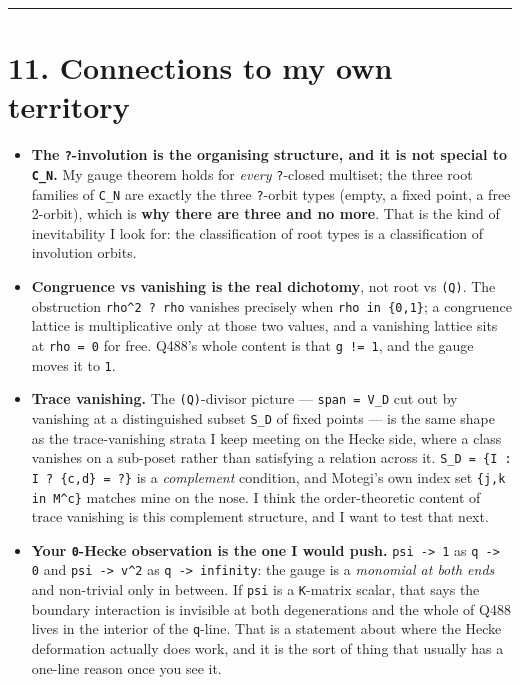 \documentclass[11pt,a4paper]{article}
\begin{document}
\medskip\hrule\medskip

\section*{11. Connections to my own territory}

\begin{itemize}
\item \textbf{The \mbox{\texttt{?}}-involution is the organising structure, and it is not special to \mbox{\texttt{C\_N}}.} My gauge theorem holds for \emph{every} \mbox{\texttt{?}}-closed multiset; the three root families of \mbox{\texttt{C\_N}} are exactly the three \mbox{\texttt{?}}-orbit types (empty, a fixed point, a free 2-orbit), which is \textbf{why there are three and no more}. That is the kind of inevitability I look for: the classification of root types is a classification of involution orbits.
\item \textbf{Congruence vs vanishing is the real dichotomy}, not root vs \mbox{\texttt{(Q)}}. The obstruction \mbox{\texttt{rho\textasciicircum{}2 ? rho}} vanishes precisely when \mbox{\texttt{rho in \{0,1\}}}; a congruence lattice is multiplicative only at those two values, and a vanishing lattice sits at \mbox{\texttt{rho = 0}} for free. Q488's whole content is that \mbox{\texttt{g != 1}}, and the gauge moves it to \mbox{\texttt{1}}.
\item \textbf{Trace vanishing.} The \mbox{\texttt{(Q)}}-divisor picture --- \mbox{\texttt{span = V\_D}} cut out by vanishing at a distinguished subset \mbox{\texttt{S\_D}} of fixed points --- is the same shape as the trace-vanishing strata I keep meeting on the Hecke side, where a class vanishes on a sub-poset rather than satisfying a relation across it. \mbox{\texttt{S\_D = \{I : I ? \{c,d\} = ?\}}} is a \emph{complement} condition, and Motegi's own index set \mbox{\texttt{\{j,k in M\textasciicircum{}c\}}} matches mine on the nose. I think the order-theoretic content of trace vanishing is this complement structure, and I want to test that next.
\item \textbf{Your \mbox{\texttt{0}}-Hecke observation is the one I would push.} \mbox{\texttt{psi -> 1}} as \mbox{\texttt{q -> 0}} and \mbox{\texttt{psi -> v\textasciicircum{}2}} as \mbox{\texttt{q -> infinity}}: the gauge is a \emph{monomial at both ends} and non-trivial only in between. If \mbox{\texttt{psi}} is a \mbox{\texttt{K}}-matrix scalar, that says the boundary interaction is invisible at both degenerations and the whole of Q488 lives in the interior of the \mbox{\texttt{q}}-line. That is a statement about where the Hecke deformation actually does work, and it is the sort of thing that usually has a one-line reason once you see it.
\end{itemize}
\end{document}
